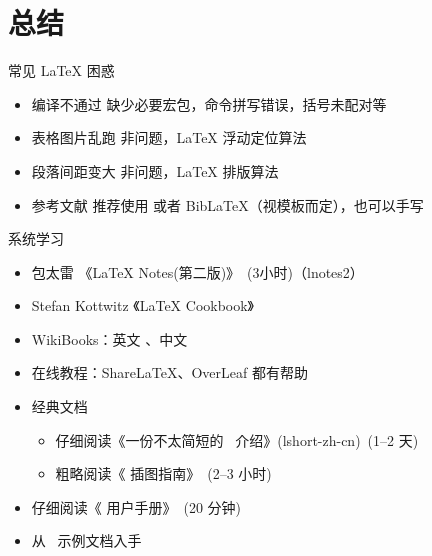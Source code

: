 
\section{总结}

\begin{frame}{常见 \LaTeX{} 困惑}
  \begin{itemize}
    \item \alert{编译不通过} 缺少必要宏包，命令拼写错误，括号未配对等
    \item \alert{表格图片乱跑} 非问题，\LaTeX{} 浮动定位算法 
    \item \alert{段落间距变大} 非问题，\LaTeX{} 排版算法
    \item \alert{参考文献} 推荐使用 \BibTeX{} 或者 Bib\LaTeX{}（视模板而定），也可以手写  
  \end{itemize}
\end{frame}

\begin{frame}{系统学习}
  \begin{itemize}
      \item 包太雷 《\LaTeX{} Notes(第二版)》~(3小时)（lnotes2） 
      \item Stefan Kottwitz 《LaTeX Cookbook》
      \item WikiBooks：英文 、中文 
      \item 在线教程：ShareLaTeX、OverLeaf 都有帮助
      \item 经典文档
        \begin{itemize}
          \item 仔细阅读《一份不太简短的~\LaTeXe{} 介绍》(lshort-zh-cn)~(1--2 天)
          \item 粗略阅读《\LaTeXe{} 插图指南》~(2--3 小时)
        \end{itemize}
      \item 仔细阅读《\ThuThesis{} 用户手册》~(20 分钟)
      \item 从~\ThuThesis{} 示例文档入手
  \end{itemize}
\end{frame}

